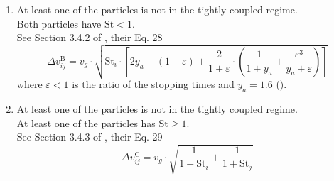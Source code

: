 \begin{enumerate}
            \item At least one of the particles is not in the tightly coupled regime. \\
                Both particles have $\text{St} < 1$. \\
                See Section 3.4.2 of \cite{ormel_cuzzi_2007}, their Eq. 28
                \begin{equation}
                    \Delta v_{ij}^\text{B} = v_g \cdot \sqrt{
                        \text{St}_i \cdot \left[
                            2y_a - (1+\varepsilon) + \frac{2}{1+\varepsilon} \cdot \left(
                                \frac{1}{1+y_a} + \frac{\varepsilon^3}{y_a+\varepsilon}
                            \right)
                        \right] 
                    }
                \end{equation}
                where $\varepsilon < 1$ is the ratio of the stopping times 
                and $y_a = 1.6$ ().

            \item At least one of the particles is not in the tightly coupled regime. \\ 
                At least one of the particles has $\text{St} \geq 1$. \\
                See Section 3.4.3 of \cite{ormel_cuzzi_2007}, their Eq. 29
                \begin{equation}
                    \Delta v_{ij}^\text{C} = v_g \cdot \sqrt{
                        \frac{1}{1+\text{St}_i} + \frac{1}{1+\text{St}_j}
                    }
                \end{equation}

        \end{enumerate}


